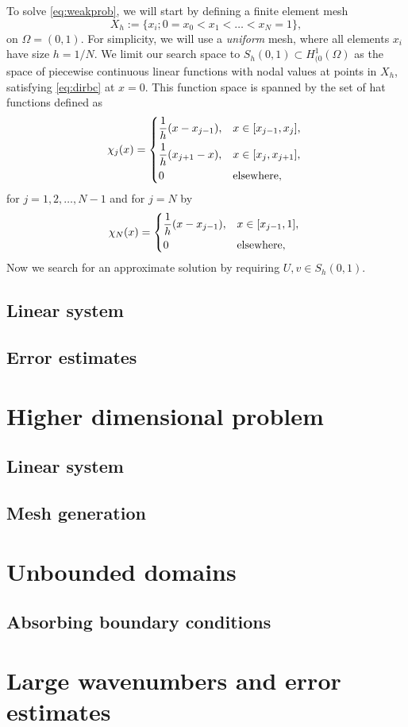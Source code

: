 \documentclass[a4paper]{article}
\newcommand{\HOzero}{\ensuremath{H^1_{(0}(\Omega)}}
\begin{document}
To solve \eqref{eq:weakprob}, we will start by defining a finite element
mesh
\begin{equation}
  X_h := \{ x_i ; 0 = x_0 < x_1 < \hdots < x_N = 1 \},
\end{equation}
on $\Omega = (0, 1)$. For simplicity, we will use a \emph{uniform}
mesh, where all elements $x_i$ have size $h = 1/N$.
We limit our search space to $S_h(0,1) \subset \HOzero$ as the
space of piecewise continuous linear functions with nodal values
at points in $X_h$, satisfying \eqref{eq:dirbc} at $x = 0$.
This function space is spanned by the set of hat functions
defined as
\begin{equation}
  \chi_j(x) = \begin{dcases*}
    \frac{1}{h} (x - x_{j - 1}), & $x \in [x_{j - 1}, x_j],$ \\
    \frac{1}{h} (x_{j + 1} - x), & $x \in [x_{j}, x_{j + 1}],$ \\
    0 & elsewhere,
  \end{dcases*}
\end{equation}
for $j = 1, 2, \ldots, N - 1$ and for $j = N$ by
\begin{equation}
  \chi_N(x) = \begin{dcases*}
    \frac{1}{h} (x - x_{j - 1}), & $x \in [x_{j - 1}, 1],$ \\
    0 & elsewhere,
  \end{dcases*}
\end{equation}
Now we search for an approximate solution by requiring
$U, v \in S_h(0,1)$.

\subsection{Linear system}

\subsection{Error estimates}


\section{Higher dimensional problem}

\subsection{Linear system}

\subsection{Mesh generation}


\section{Unbounded domains}

\subsection{Absorbing boundary conditions}


\section{Large wavenumbers and error estimates}
\end{document}
